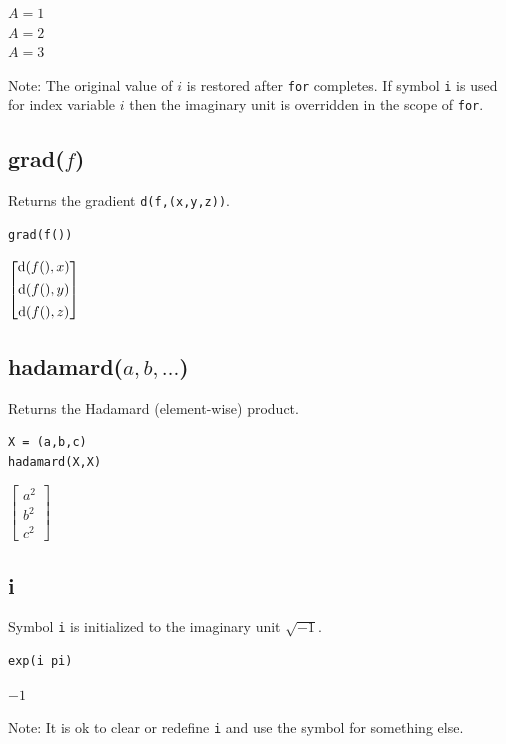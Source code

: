 \documentclass[12pt]{article}
\begin{document}
\noindent
$A=1$\\
$A=2$\\
$A=3$

\bigskip
\noindent
Note: The original value of $i$ is restored after {\tt for} completes.
If symbol {\tt i} is used for index variable $i$
then the imaginary unit is overridden in the scope of {\tt for}.

\subsection*{grad($f$)}

Returns the gradient \verb$d(f,(x,y,z))$.

{\color{blue}
\begin{verbatim}
grad(f())
\end{verbatim}
}

\noindent
$\displaystyle
\begin{bmatrix}
{\rm d}(f(),x)
\\[1ex]
{\rm d}(f(),y)
\\[1ex]
{\rm d}(f(),z)
\end{bmatrix}
$

\subsection*{hadamard($a,b,\ldots$)}

Returns the Hadamard (element-wise) product.

{\color{blue}
\begin{verbatim}
X = (a,b,c)
hadamard(X,X)
\end{verbatim}
}

\noindent
$\displaystyle
\begin{bmatrix}
a^2
\\[1ex]
b^2
\\[1ex]
c^2
\end{bmatrix}
$

\subsection*{i}

Symbol {\tt i} is initialized to the imaginary unit $\sqrt{-1}$.

{\color{blue}
\begin{verbatim}
exp(i pi)
\end{verbatim}
}

\noindent
$-1$

\bigskip
\noindent
Note: It is ok to clear or redefine {\tt i} and use the symbol for something else.
\end{document}
